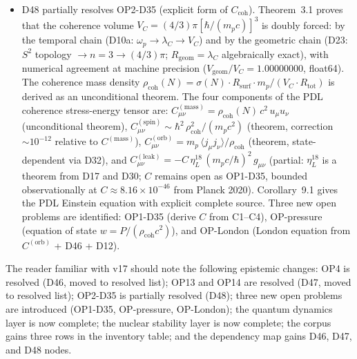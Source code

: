 \documentclass[11pt,a4paper]{article}
\theoremstyle{plain}
\theoremstyle{definition}
\theoremstyle{remark}
\newcommand{\Rsurf}{R_{\mathrm{surf}}}
\newcommand{\Rtot}{R_{\mathrm{tot}}}
\newcommand{\sigmaN}{\sigma(N)}
\newcommand{\rhocoh}{\rho_{\mathrm{coh}}}
\newcommand{\Ccoh}{C_{\mathrm{coh}}}
\begin{document}
\begin{itemize}
\item D48 partially resolves OP2-D35 (explicit form of $\Ccoh$). Theorem~3.1 proves that the coherence volume $V_C = (4/3)\pi[\hbar/(m_p c)]^3$ is doubly forced: by the temporal chain (D10a: $\omega_p \to \lambda_C \to V_C$) and by the geometric chain (D23: $S^2$ topology $\to n=3 \to (4/3)\pi$; $R_{\mathrm{geom}} = \lambda_C$ algebraically exact), with numerical agreement at machine precision ($V_{\mathrm{geom}}/V_C = 1.00000000$, float64). The coherence mass density $\rhocoh(N) = \sigmaN \cdot \Rsurf \cdot m_p / (V_C \cdot \Rtot)$ is derived as an unconditional theorem. The four components of the PDL coherence stress-energy tensor are: $C^{(\mathrm{mass})}_{\mu\nu} = \rhocoh(N)\,c^2\,u_\mu u_\nu$ (unconditional theorem), $C^{(\mathrm{spin})}_{\mu\nu} \sim \hbar^2\,\rhocoh^2/(m_p c^2)$ (theorem, correction $\sim 10^{-12}$ relative to $C^{(\mathrm{mass})}$), $C^{(\mathrm{orb})}_{\mu\nu} = m_p\,\langle j_\mu j_\nu\rangle/\rhocoh$ (theorem, state-dependent via D32), and $C^{(\mathrm{leak})}_{\mu\nu} = -C\,\eta_L^{18}\,(m_p c/\hbar)^2\,g_{\mu\nu}$ (partial: $\eta_L^{18}$ is a theorem from D17 and D30; $C$ remains open as OP1-D35, bounded observationally at $C \approx 8.16\times10^{-46}$ from Planck 2020). Corollary~9.1 gives the PDL Einstein equation with explicit complete source. Three new open problems are identified: OP1-D35 (derive $C$ from C1--C4), OP-pressure (equation of state $w = P/(\rhocoh c^2)$), and OP-London (London equation from $C^{(\mathrm{orb})}$ + D46 + D12).
\end{itemize}

The reader familiar with v17 should note the following epistemic changes: OP4 is resolved (D46, moved to resolved list); OP13 and OP14 are resolved (D47, moved to resolved list); OP2-D35 is partially resolved (D48); three new open problems are introduced (OP1-D35, OP-pressure, OP-London); the quantum dynamics layer is now complete; the nuclear stability layer is now complete; the corpus gains three rows in the inventory table; and the dependency map gains D46, D47, and D48 nodes.
\end{document}
